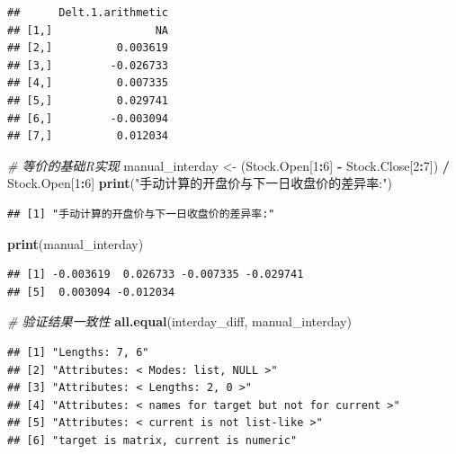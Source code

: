 \documentclass[]{ctexbook}
\newenvironment{Shaded}{\begin{snugshade}}{\end{snugshade}}
\newcommand{\CommentTok}[1]{\textcolor[rgb]{0.56,0.35,0.01}{\textit{#1}}}
\newcommand{\DecValTok}[1]{\textcolor[rgb]{0.00,0.00,0.81}{#1}}
\newcommand{\FunctionTok}[1]{\textcolor[rgb]{0.13,0.29,0.53}{\textbf{#1}}}
\newcommand{\NormalTok}[1]{#1}
\newcommand{\OtherTok}[1]{\textcolor[rgb]{0.56,0.35,0.01}{#1}}
\newcommand{\SpecialCharTok}[1]{\textcolor[rgb]{0.81,0.36,0.00}{\textbf{#1}}}
\newcommand{\StringTok}[1]{\textcolor[rgb]{0.31,0.60,0.02}{#1}}
\begin{document}
\begin{verbatim}
##      Delt.1.arithmetic
## [1,]                NA
## [2,]          0.003619
## [3,]         -0.026733
## [4,]          0.007335
## [5,]          0.029741
## [6,]         -0.003094
## [7,]          0.012034
\end{verbatim}

\begin{Shaded}
\begin{Highlighting}[]
\CommentTok{\# 等价的基础R实现}
\NormalTok{manual\_interday }\OtherTok{\textless{}{-}}\NormalTok{ (Stock.Open[}\DecValTok{1}\SpecialCharTok{:}\DecValTok{6}\NormalTok{] }\SpecialCharTok{{-}}\NormalTok{ Stock.Close[}\DecValTok{2}\SpecialCharTok{:}\DecValTok{7}\NormalTok{]) }\SpecialCharTok{/}\NormalTok{ Stock.Open[}\DecValTok{1}\SpecialCharTok{:}\DecValTok{6}\NormalTok{]}
\FunctionTok{print}\NormalTok{(}\StringTok{"手动计算的开盘价与下一日收盘价的差异率:"}\NormalTok{)}
\end{Highlighting}
\end{Shaded}

\begin{verbatim}
## [1] "手动计算的开盘价与下一日收盘价的差异率:"
\end{verbatim}

\begin{Shaded}
\begin{Highlighting}[]
\FunctionTok{print}\NormalTok{(manual\_interday)}
\end{Highlighting}
\end{Shaded}

\begin{verbatim}
## [1] -0.003619  0.026733 -0.007335 -0.029741
## [5]  0.003094 -0.012034
\end{verbatim}

\begin{Shaded}
\begin{Highlighting}[]
\CommentTok{\# 验证结果一致性}
\FunctionTok{all.equal}\NormalTok{(interday\_diff, manual\_interday)}
\end{Highlighting}
\end{Shaded}

\begin{verbatim}
## [1] "Lengths: 7, 6"                                       
## [2] "Attributes: < Modes: list, NULL >"                   
## [3] "Attributes: < Lengths: 2, 0 >"                       
## [4] "Attributes: < names for target but not for current >"
## [5] "Attributes: < current is not list-like >"            
## [6] "target is matrix, current is numeric"
\end{verbatim}
\end{document}

